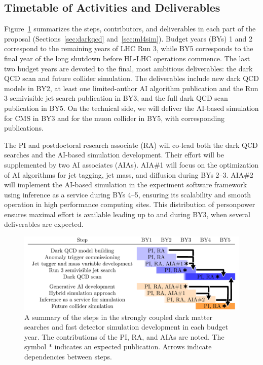 \subsection{Timetable of Activities and Deliverables}

Figure~\ref{fig:activities} summarizes the steps, contributors, and deliverables in each part of the proposal (Sections~\ref{sec:darkqcd} and~\ref{sec:ml4sim}).
Budget years (BYs) 1 and 2 correspond to the remaining years of LHC Run 3, while BY5 corresponds to the final year of the long shutdown before HL-LHC operations commence.
The last two budget years are devoted to the final, most ambitious deliverables: the dark QCD scan and future collider simulation.
The deliverables include new dark QCD models in BY2, at least one limited-author AI algorithm publication and the Run 3 semivisible jet search publication in BY3, and the full dark QCD scan publication in BY5.
On the technical side, we will deliver the AI-based simulation for CMS in BY3 and for the muon collider in BY5, with corresponding publications.

The PI and postdoctoral research associate (RA) will co-lead both the dark QCD searches and the AI-based simulation development.
Their effort will be supplemented by two AI associates (AIAs).
AIA\#1 will focus on the optimization of AI algorithms for jet tagging, jet mass, and diffusion during BYs 2--3.
AIA\#2 will implement the AI-based simulation in the experiment software framework using inference as a service during BYs 4--5, ensuring its scalability and smooth operation in high performance computing sites.
This distribution of personpower ensures maximal effort is available leading up to and during BY3, when several deliverables are expected.

\begin{figure}[htb!]
\centering
\includegraphics[width=0.95\myfigurewidth]{figures/table_final.pdf}
\caption{A summary of the steps in the strongly coupled dark matter searches and fast detector simulation development in each budget year. The contributions of the PI, RA, and AIAs are noted. The symbol $\ast$ indicates an expected publication. Arrows indicate dependencies between steps.}
\label{fig:activities}
\end{figure}

\clearpage
